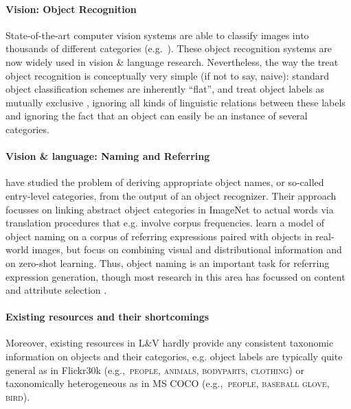 \documentclass[11pt]{article}
\newcommand{\cat}[1]{\textsc{#1}}
\begin{document}
\paragraph{Vision: Object Recognition}

State-of-the-art computer vision systems are able to classify images into thousands of different categories (e.g.\  ). These object recognition systems are now widely used in vision \& language research.
Nevertheless, the way the treat object recognition is conceptually very simple (if not to say, naive):  standard object classification schemes are inherently ``flat'', and treat object labels as mutually exclusive \cite{deng2014large}, ignoring all kinds of linguistic relations between these labels and ignoring the fact that an object can easily be an instance of several categories.


\paragraph{Vision \& language: Naming and Referring}

 have studied the problem of deriving appropriate object names, or so-called entry-level
 categories, from the output of an object recognizer. Their approach focusses on linking abstract object categories in ImageNet to actual words via translation procedures that e.g. involve corpus frequencies. 
  learn a model of object naming on a corpus of referring expressions paired with objects in real-world images, but focus on combining visual and distributional information and on zero-shot learning.
 Thus, object naming is an important task for referring expression generation, though most research in this area has focussed on content and attribute selection \cite{Kazemzadeh2014,gkatzia:2015,zarrieschlang:easy-pre,Maoetal:cocorefexp}.

\paragraph{Existing resources and their shortcomings}
Moreover, existing resources in L\&V hardly provide any consistent taxonomic information on objects and their categories, e.g. object labels are typically quite general as in Flickr30k \cite{plummer2015flickr30kentities} (e.g.,~\cat{people, animals, bodyparts, clothing}) or taxonomically heterogeneous as in MS COCO \cite{mscoco} (e.g.,~\cat{people, baseball glove, bird}).
\end{document}
